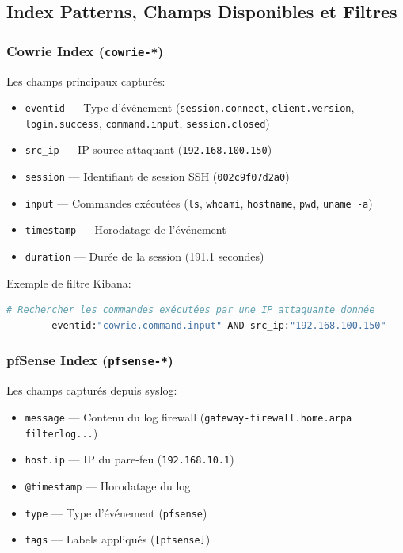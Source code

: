 \documentclass[12pt,a4paper,openany]{report}
\begin{document}
	\subsection{Index Patterns, Champs Disponibles et Filtres}
	
	\subsubsection{Cowrie Index (\texttt{cowrie-*})}
	Les champs principaux capturés:
	\begin{itemize}
		\item \texttt{eventid} --- Type d'événement (\texttt{session.connect}, \texttt{client.version}, \texttt{login.success}, \texttt{command.input}, \texttt{session.closed})
		\item \texttt{src\_ip} --- IP source attaquant (\texttt{192.168.100.150})
		\item \texttt{session} --- Identifiant de session SSH (\texttt{002c9f07d2a0})
		\item \texttt{input} --- Commandes exécutées (\texttt{ls}, \texttt{whoami}, \texttt{hostname}, \texttt{pwd}, \texttt{uname -a})
		\item \texttt{timestamp} --- Horodatage de l'événement
		\item \texttt{duration} --- Durée de la session (191.1 secondes)
	\end{itemize}
	
	Exemple de filtre Kibana:
	\begin{lstlisting}[language=bash]
		# Rechercher les commandes exécutées par une IP attaquante donnée
		eventid:"cowrie.command.input" AND src_ip:"192.168.100.150"
	\end{lstlisting}
	
	\subsubsection{pfSense Index (\texttt{pfsense-*})}
	Les champs capturés depuis syslog:
	\begin{itemize}
		\item \texttt{message} --- Contenu du log firewall (\texttt{gateway-firewall.home.arpa filterlog...})
		\item \texttt{host.ip} --- IP du pare-feu (\texttt{192.168.10.1})
		\item \texttt{@timestamp} --- Horodatage du log
		\item \texttt{type} --- Type d'événement (\texttt{pfsense})
		\item \texttt{tags} --- Labels appliqués (\texttt{[pfsense]})
	\end{itemize}
	
\end{document}

